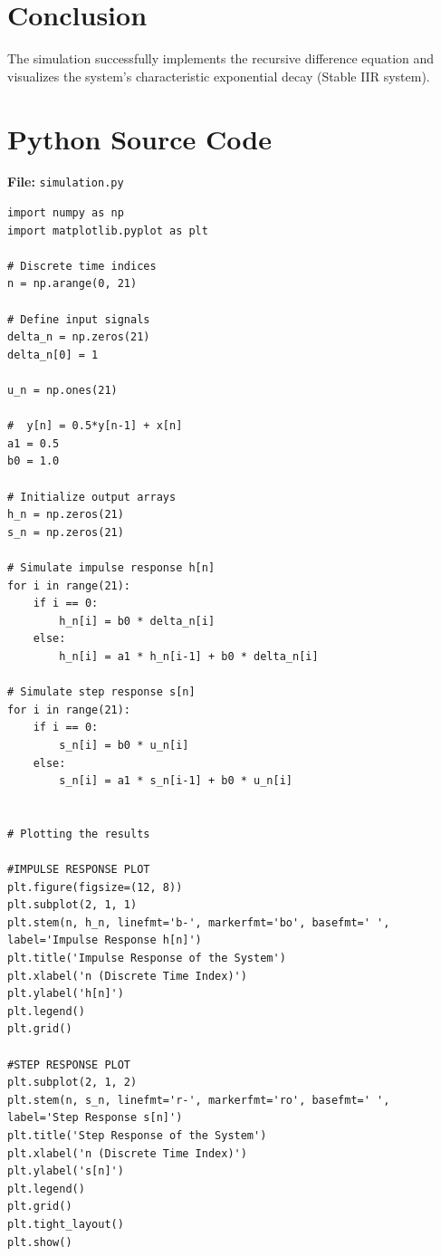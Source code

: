 \documentclass[11pt, a4paper]{article}
\begin{document}
\section{Conclusion}
The simulation successfully implements the recursive difference equation and visualizes the system's characteristic exponential decay (Stable IIR system).

\appendix
\section{Python Source Code}
\textbf{File:} \texttt{simulation.py}
\begin{lstlisting}[caption={Time Domain LTI System Simulation -- Assignment 2}]
import numpy as np
import matplotlib.pyplot as plt

# Discrete time indices
n = np.arange(0, 21)

# Define input signals
delta_n = np.zeros(21)  
delta_n[0] = 1

u_n = np.ones(21)  

#  y[n] = 0.5*y[n-1] + x[n]
a1 = 0.5
b0 = 1.0  

# Initialize output arrays
h_n = np.zeros(21)  
s_n = np.zeros(21)  

# Simulate impulse response h[n]
for i in range(21):
    if i == 0:
        h_n[i] = b0 * delta_n[i]
    else:
        h_n[i] = a1 * h_n[i-1] + b0 * delta_n[i]

# Simulate step response s[n]
for i in range(21):
    if i == 0:
        s_n[i] = b0 * u_n[i]
    else:
        s_n[i] = a1 * s_n[i-1] + b0 * u_n[i]


# Plotting the results

#IMPULSE RESPONSE PLOT
plt.figure(figsize=(12, 8))
plt.subplot(2, 1, 1)
plt.stem(n, h_n, linefmt='b-', markerfmt='bo', basefmt=' ', label='Impulse Response h[n]')
plt.title('Impulse Response of the System') 
plt.xlabel('n (Discrete Time Index)')
plt.ylabel('h[n]')
plt.legend()
plt.grid()

#STEP RESPONSE PLOT
plt.subplot(2, 1, 2)
plt.stem(n, s_n, linefmt='r-', markerfmt='ro', basefmt=' ', label='Step Response s[n]')
plt.title('Step Response of the System')
plt.xlabel('n (Discrete Time Index)')
plt.ylabel('s[n]')
plt.legend()
plt.grid()
plt.tight_layout()
plt.show()
\end{lstlisting}
\end{document}
